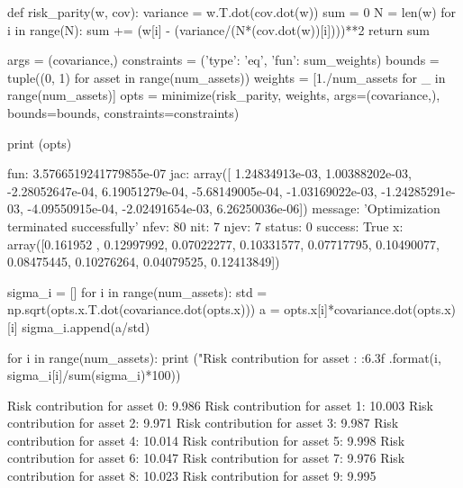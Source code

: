 \cprotEnv \begin{solution}
\begin{ipython}
def risk_parity(w, cov):
    variance = w.T.dot(cov.dot(w))
    sum = 0 
    N = len(w)
    for i in range(N):
        sum += (w[i] - (variance/(N*(cov.dot(w))[i])))**2
    return sum

args = (covariance,)
constraints = ({'type': 'eq', 'fun': sum_weights})
bounds = tuple((0, 1) for asset in range(num_assets))
weights = [1./num_assets for _ in range(num_assets)]
opts = minimize(risk_parity, weights, args=(covariance,),
                bounds=bounds, constraints=constraints)

print (opts)
\end{ipython}
\begin{ioutput}
     fun: 3.5766519241779855e-07
     jac: array([ 1.24834913e-03,  1.00388202e-03, -2.28052647e-04,  6.19051279e-04,
                 -5.68149005e-04, -1.03169022e-03, -1.24285291e-03, -4.09550915e-04,
                 -2.02491654e-03,  6.26250036e-06])
 message: 'Optimization terminated successfully'
    nfev: 80
     nit: 7
    njev: 7
  status: 0
 success: True
       x: array([0.161952  , 0.12997992, 0.07022277, 0.10331577, 0.07717795,
                 0.10490077, 0.08475445, 0.10276264, 0.04079525, 0.12413849])
\end{ioutput}
\begin{ipython}
sigma_i = []
for i in range(num_assets):
    std = np.sqrt(opts.x.T.dot(covariance.dot(opts.x)))
    a = opts.x[i]*covariance.dot(opts.x)[i]
    sigma_i.append(a/std)

for i in range(num_assets):
    print ("Risk contribution for asset {}: {:6.3f}%
           .format(i, sigma_i[i]/sum(sigma_i)*100))
\end{ipython}
\begin{ioutput}
Risk contribution for asset 0:  9.986%
Risk contribution for asset 1: 10.003%
Risk contribution for asset 2:  9.971%
Risk contribution for asset 3:  9.987%
Risk contribution for asset 4: 10.014%
Risk contribution for asset 5:  9.998%
Risk contribution for asset 6: 10.047%
Risk contribution for asset 7:  9.976%
Risk contribution for asset 8: 10.023%
Risk contribution for asset 9:  9.995%
\end{ioutput}
\end{solution}

